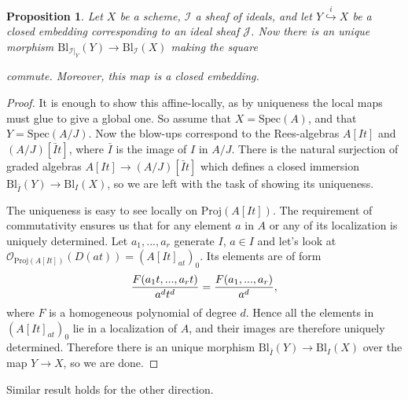 \documentclass[12pt,a4paper,leqno]{article}
\newcommand{\OO}{\mathcal{O}}
\newcommand{\spec}{\mathrm{Spec}}
\newcommand{\bl}{\mathrm{Bl}}
\newcommand{\proj}{\mathrm{Proj}}
\theoremstyle{plain}
\newtheorem{prop}[theo]{Proposition}
\theoremstyle{definition}
\theoremstyle{remark}
\begin{document}
\begin{prop}\label{BlowUpCommutesWithClosedEmbeddings}
Let $X$ be a scheme, $\mathscr{I}$ a sheaf of ideals, and let $Y \stackrel{i}{\hookrightarrow} X$ be a closed embedding corresponding to an ideal sheaf $\mathscr{J}$. Now there is an unique morphism $\bl_{\mathscr{I}|_Y}(Y) \to \bl_{\mathscr{I}}(X)$ making the square
\begin{center}
\end{center}
commute. Moreover, this map is a closed embedding.
\end{prop}
\begin{proof}
It is enough to show this affine-locally, as by uniqueness the local maps must glue to give a global one. So assume that $X = \spec (A)$, and that $Y = \spec (A/J)$. Now the blow-ups correspond to the Rees-algebras $A[It]$ and $(A/J)[\bar{I}t]$, where $\bar I$ is the image of $I$ in $A/J$. There is the natural surjection of graded algebras $A[It] \to (A/J)[\bar{I}t]$ which defines a closed immersion $\bl_{\bar{I}} (Y) \to \bl_I (X)$, so we are left with the task of showing its uniqueness.

The uniqueness is easy to see locally on $\proj (A[It])$. The requirement of commutativity ensures us that for any element $a$ in $A$ or any of its localization is uniquely determined. Let $a_1,...,a_r$ generate $I$, $a \in I$ and let's look at $\OO_{\proj (A[It])} (D(at)) = (A[It]_{at})_0$. Its elements are of form
\begin{equation*}
{F(a_1t,...,a_rt) \over a^dt^d} = {F(a_1,...,a_r) \over a^d},
\end{equation*}
where $F$ is a homogeneous polynomial of degree $d$. Hence all the elements in $(A[It]_{at})_0$ lie in a localization of $A$, and their images are therefore uniquely determined. Therefore there is an unique morphism $\bl_{\bar{I}} (Y) \to \bl_I (X)$ over the map $Y \to X$, so we are done.
\end{proof}

Similar result holds for the other direction.
\end{document}
